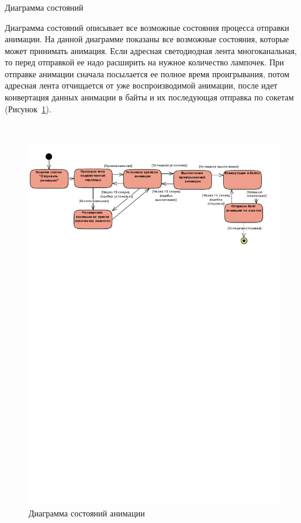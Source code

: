 \subsubsection{} Диаграмма состояний
\label{sec:develop:umlDiagrams:useCase}

Диаграмма состояний описывает все возможные состояния процесса отправки анимации. На данной диаграмме показаны все возможные состояния, которые может принимать анимация. Если адресная светодиодная лента многоканальная, то перед отправкой ее надо расширить на нужное количество лампочек. При отправке анимации сначала посылается ее полное время проигрывания, потом адресная лента отчищается от уже воспроизводимой анимации, после идет конвертация данных анимации в байты и их последующая отправка по сокетам (Рисунок~\ref{fig:develop:umlDiagrams:state}).

~
\begin{figure}[H]
\centering
	\includegraphics[scale=0.9]{figures/diagrams/uml_state.pdf}
	\caption{Диаграмма состояний анимации}
	\label{fig:develop:umlDiagrams:state}
\end{figure}


